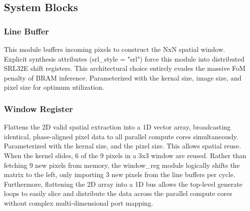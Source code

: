 \documentclass[12pt, a4paper]{article}
\begin{document}


\subsection{System Blocks}

\subsubsection{Line Buffer}
This module buffers incoming pixels to construct the NxN spatial window. Explicit synthesis attributes (srl\_style = "srl") force this module into distributed SRL32E shift registers. This architectural choice entirely evades the massive FoM penalty of BRAM inference. Parameterized with the kernal size, image size, and pixel size for optimum utilization.

\subsubsection{Window Register}
Flattens the 2D valid spatial extraction into a 1D vector array, broadcasting identical, phase-aligned pixel data to all parallel compute cores simultaneously. Parameterized with the kernal size, and the pixel size. This allows spatial reuse. When the kernel slides, 6 of the 9 pixels in a 3x3 window are reused. Rather than fetching 9 new pixels from memory, the window\_reg module logically shifts the matrix to the left, only importing 3 new pixels from the line buffers per cycle. Furthermore, flattening the 2D array into a 1D bus allows the top-level generate loops to easily slice and distribute the data across the parallel compute cores without complex multi-dimensional port mapping.
\end{document}
